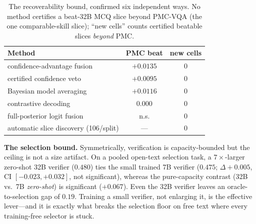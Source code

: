 \documentclass[conference]{IEEEtran}
\begin{document}
\begin{table}[t]
\centering
\caption{The recoverability bound, confirmed six independent ways. No method certifies a beat-32B MCQ slice beyond PMC-VQA (the one comparable-skill slice); ``new cells'' counts certified beatable slices \emph{beyond} PMC.}
\label{tab:limits}
\footnotesize
\setlength{\tabcolsep}{4pt}
\begin{tabular}{@{}lcc@{}}
\toprule
Method & PMC beat & new cells \\
\midrule
confidence-advantage fusion          & $+0.0135$ & 0 \\
certified confidence veto            & $+0.0095$ & 0 \\
Bayesian model averaging             & $+0.0116$ & 0 \\
contrastive decoding                 & $0.000$ & 0 \\
full-posterior logit fusion          & n.s. & 0 \\
automatic slice discovery (106/split)& --- & 0 \\
\bottomrule
\end{tabular}
\end{table}

\textbf{The selection bound.} Symmetrically, verification is capacity-bounded but the ceiling is not a size artifact. On a pooled open-text selection task, a $7{\times}$-larger zero-shot 32B verifier ($0.480$) ties the small trained 7B verifier ($0.475$; $\Delta{+}0.005$, CI $[-0.023,+0.032]$, not significant), whereas the pure-capacity contrast (32B vs.\ 7B \emph{zero-shot}) is significant ($+0.067$). Even the 32B verifier leaves an oracle-to-selection gap of $0.19$. Training a small verifier, not enlarging it, is the effective lever---and it is exactly what breaks the selection floor on free text where every training-free selector is stuck.
\end{document}
